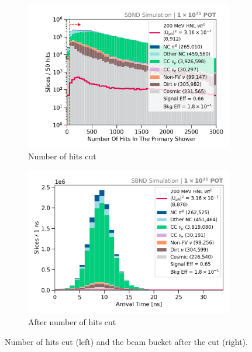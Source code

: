 \begin{figure}[ht!]
        \begin{subfigure}[b]{0.495\textwidth}   
            \centering 
            \includegraphics[width=\textwidth]{nHits}
            \caption{Number of hits cut}%
            \label{fig:Nhits_cut}
        \end{subfigure}
        \hfill
        \begin{subfigure}[b]{0.495\textwidth}   
            \centering 
            \includegraphics[width=\textwidth]{beam_bucket_postNhits}
            \caption{After number of hits cut}%
            \label{fig:bb_postNhits}
        \end{subfigure}
	\caption[Number of Hits Cut]{
		Number of hits cut (left) and the beam bucket after the cut (right). 
	}
        \label{fig:quality_hits_cut}
\end{figure}

